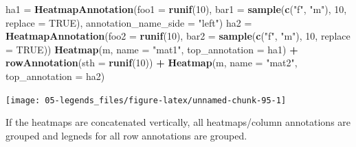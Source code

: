\documentclass[]{book}
\newenvironment{Shaded}{\begin{snugshade}}{\end{snugshade}}
\newcommand{\KeywordTok}[1]{\textcolor[rgb]{0.13,0.29,0.53}{\textbf{#1}}}
\newcommand{\DataTypeTok}[1]{\textcolor[rgb]{0.13,0.29,0.53}{#1}}
\newcommand{\DecValTok}[1]{\textcolor[rgb]{0.00,0.00,0.81}{#1}}
\newcommand{\StringTok}[1]{\textcolor[rgb]{0.31,0.60,0.02}{#1}}
\newcommand{\OtherTok}[1]{\textcolor[rgb]{0.56,0.35,0.01}{#1}}
\newcommand{\OperatorTok}[1]{\textcolor[rgb]{0.81,0.36,0.00}{\textbf{#1}}}
\newcommand{\NormalTok}[1]{#1}
\theoremstyle{definition}
\theoremstyle{definition}
\theoremstyle{definition}
\theoremstyle{remark}
\begin{document}
\begin{Shaded}
\begin{Highlighting}[]
\NormalTok{ha1 =}\StringTok{ }\KeywordTok{HeatmapAnnotation}\NormalTok{(}\DataTypeTok{foo1 =} \KeywordTok{runif}\NormalTok{(}\DecValTok{10}\NormalTok{), }\DataTypeTok{bar1 =} \KeywordTok{sample}\NormalTok{(}\KeywordTok{c}\NormalTok{(}\StringTok{"f"}\NormalTok{, }\StringTok{"m"}\NormalTok{), }\DecValTok{10}\NormalTok{, }\DataTypeTok{replace =} \OtherTok{TRUE}\NormalTok{), }
    \DataTypeTok{annotation_name_side =} \StringTok{"left"}\NormalTok{)}
\NormalTok{ha2 =}\StringTok{ }\KeywordTok{HeatmapAnnotation}\NormalTok{(}\DataTypeTok{foo2 =} \KeywordTok{runif}\NormalTok{(}\DecValTok{10}\NormalTok{), }\DataTypeTok{bar2 =} \KeywordTok{sample}\NormalTok{(}\KeywordTok{c}\NormalTok{(}\StringTok{"f"}\NormalTok{, }\StringTok{"m"}\NormalTok{), }\DecValTok{10}\NormalTok{, }\DataTypeTok{replace =} \OtherTok{TRUE}\NormalTok{))}
\KeywordTok{Heatmap}\NormalTok{(m, }\DataTypeTok{name =} \StringTok{"mat1"}\NormalTok{, }\DataTypeTok{top_annotation =}\NormalTok{ ha1) }\OperatorTok{+}
\KeywordTok{rowAnnotation}\NormalTok{(}\DataTypeTok{sth =} \KeywordTok{runif}\NormalTok{(}\DecValTok{10}\NormalTok{)) }\OperatorTok{+}
\KeywordTok{Heatmap}\NormalTok{(m, }\DataTypeTok{name =} \StringTok{"mat2"}\NormalTok{, }\DataTypeTok{top_annotation =}\NormalTok{ ha2)}
\end{Highlighting}
\end{Shaded}

\begin{center}\texttt{[image: 05-legends\_files/figure-latex/unnamed-chunk-95-1]} \end{center}

If the heatmaps are concatenated vertically, all heatmaps/column
annotations are grouped and legneds for all row annotations are grouped.
\end{document}
